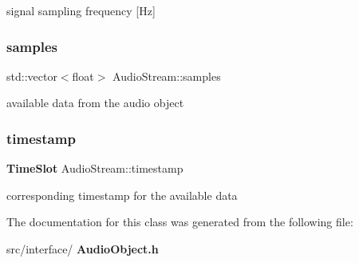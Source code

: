 signal sampling frequency [Hz] \mbox{\label{class_audio_stream_ac64fd676a85ecf3809ba31f16084596e}} 
\subsubsection{samples}
{\footnotesize\ttfamily std\+::vector$<$float$>$ Audio\+Stream\+::samples\hspace{0.3cm}{\ttfamily [private]}}

available data from the audio object \mbox{\label{class_audio_stream_aeee7107c25a1ab45b8076e422864a518}} 
\subsubsection{timestamp}
{\footnotesize\ttfamily \textbf{ Time\+Slot} Audio\+Stream\+::timestamp}

corresponding timestamp for the available data 

The documentation for this class was generated from the following file\+:\begin{DoxyCompactItemize}
\item 
src/interface/\textbf{ Audio\+Object.\+h}\end{DoxyCompactItemize}
